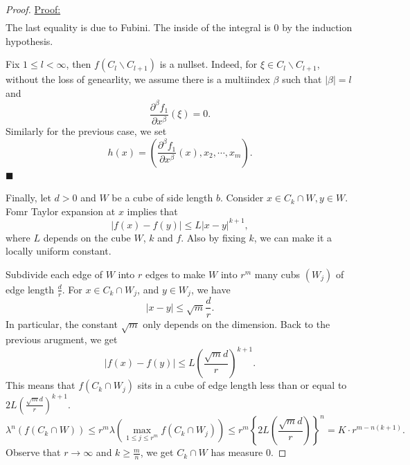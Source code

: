 \documentclass[10pt]{article}
\newenvironment{claimproof}[1]{\par\noindent\underline{Proof:}\space#1}{\hfill $\blacksquare$}
\begin{document}
\begin{proof}
\begin{claimproof}
\begin{align*}
   \end{align*} 
   The last equality is due to Fubini. The inside of the integral is $0$ by the induction hypothesis.
   \par Fix $1\leq l<\infty$, then $f(C_l\backslash C_{l+1})$ is a nullset. Indeed, for $\xi\in C_l\backslash C_{l+1}$, without the loss of genearlity, we assume there is a multiindex $\beta$ such that $\vert\beta\vert = l$ and 
   \begin{equation*}
    {\frac{\partial^\beta f_1}{\partial x^\beta}}(\xi) = 0.
   \end{equation*}
   Similarly for the previous case, we set 
   \begin{equation*}
    h(x) = \left({\frac{\partial^\beta f_1}{\partial x^\beta}}(x),x_2,\cdots,x_m\right).
   \end{equation*}
  \end{claimproof}
   \par Finally, let $d>0$ and $W$ be a cube of side length $b$. Consider $x\in C_k\cap W, y\in W$. Fomr Taylor expansion at $x$ implies that 
   \begin{equation*}
    \vert f(x)-f(y)\vert \leq L\vert x-y\vert^{k+1},
   \end{equation*}
   where $L$ depends on the cube $W$, $k$ and $f$. Also by fixing $k$, we can make it a locally uniform constant.
   \par Subdivide each edge of $W$ into $r$ edges to make $W$ into $r^m$ many cubs $(W_j)$ of edge length ${\frac d r}$. For $x\in C_k\cap W_j$, and $y\in W_j$, we have 
   \begin{equation*}
    \vert x-y\vert \leq \sqrt{m}{\frac d r}.
   \end{equation*}
   In particular, the constant $\sqrt{m}$ only depends on the dimension. Back to the previous arugment, we get 
   \begin{equation*}
    \vert f(x)-f(y)\vert \leq L\left({\frac {\sqrt{m}d} r}\right)^{k+1}.
   \end{equation*}
   This means that $f(C_k\cap W_j)$ sits in a cube of edge length less than or equal to $2L\left({\frac {\sqrt{m}d} r}\right)^{k+1}$.
   \begin{equation*}
    \lambda^n(f(C_k\cap W))\leq r^m\lambda(\max_{1\leq j\leq r^m}f(C_k\cap W_j)) \leq r^m \left\{2L\left({\frac {\sqrt{m}d} r}\right)\right\}^n = K\cdot r^{m-n(k+1)}.
   \end{equation*}
   Observe that $r\to\infty$ and $k\geq {\frac m n}$, we get $C_k\cap W$ has measure $0$.
\end{proof}
\end{document}
